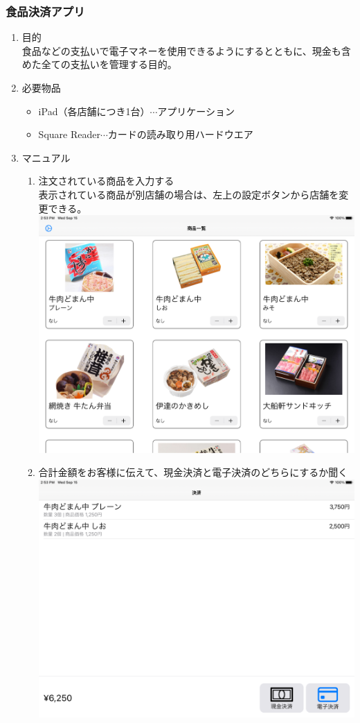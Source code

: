 \documentclass[dvipdfmx,jb5]{jarticle}
\begin{document}
 \subsubsection{食品決済アプリ}
  \begin{enumerate}
   \item 目的\\
   食品などの支払いで電子マネーを使用できるようにするとともに、現金も含めた全ての支払いを管理する目的。
   \item 必要物品
   \begin{itemize}
   \item iPad（各店舗につき1台）$\cdots$アプリケーション
   \item Square Reader$\cdots$カードの読み取り用ハードウエア
   \end{itemize}
   \item マニュアル
   \begin{enumerate}
   \item 注文されている商品を入力する\\
   表示されている商品が別店舗の場合は、左上の設定ボタンから店舗を変更できる。\\
   \includegraphics[scale=0.15]{assets/square_top-interface.png}
   \item 合計金額をお客様に伝えて、現金決済と電子決済のどちらにするか聞く\\
   \includegraphics[scale=0.15]{assets/square_second-interface.png}

\end{enumerate}
\end{enumerate}
\end{document}
